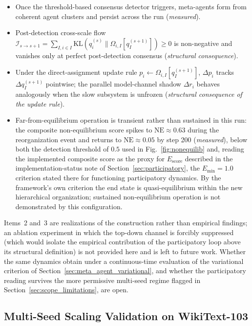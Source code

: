 \documentclass[11pt]{article}
\begin{document}
\begin{itemize}
\item Once the threshold-based consensus detector triggers, meta-agents form from coherent agent clusters and persist across the run (\emph{measured}).
\item Post-detection cross-scale flow $\mathcal{I}_{s \to s+1} = \sum_{I,i \in I}\mathrm{KL}(q_i^{(s)} \| \Omega_{i,I}[q_I^{(s+1)}]) \ge 0$ is non-negative and vanishes only at perfect post-detection consensus (\emph{structural consequence}).
\item Under the direct-assignment update rule $p_i \leftarrow \Omega_{i,I}[q_I^{(s+1)}]$, $\Delta p_i$ tracks $\Delta q_I^{(s+1)}$ pointwise; the parallel model-channel shadow $\Delta r_i$ behaves analogously when the slow subsystem is unfrozen (\emph{structural consequence of the update rule}).
\item Far-from-equilibrium operation is transient rather than sustained in this run: the composite non-equilibrium score spikes to $\mathrm{NE} \approx 0.63$ during the reorganization event and returns to $\mathrm{NE} \approx 0.05$ by step 200 (\emph{measured}), below both the detection threshold of $0.5$ used in Fig.~\ref{fig:nonequilib} and, reading the implemented composite score as the proxy for $E_{\mathrm{score}}$ described in the implementation-status note of Section~\ref{sec:participatory}, the $E_{\min} = 1.0$ criterion stated there for functioning participatory dynamics. By the framework's own criterion the end state is quasi-equilibrium within the new hierarchical organization; sustained non-equilibrium operation is not demonstrated by this configuration.
\end{itemize}

Items~2 and~3 are realizations of the construction rather than empirical findings; an ablation experiment in which the top-down channel is forcibly suppressed (which would isolate the empirical contribution of the participatory loop above its structural definition) is not provided here and is left to future work. Whether the same dynamics obtain under a continuous-time evaluation of the variational criterion of Section~\ref{sec:meta_agent_variational}, and whether the participatory reading survives the more permissive multi-seed regime flagged in Section~\ref{sec:scope_limitations}, are open.

\subsection{Multi-Seed Scaling Validation on WikiText-103}
\label{sec:scaling_validation}
\end{document}
